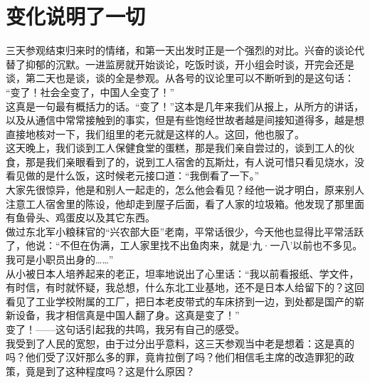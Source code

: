 \fancyhead[RO]{} %
\fancyhead[LE]{} %
\chapter*{变化说明了一切}
\thispagestyle{empty}
三天参观结束归来时的情绪，和第一天出发时正是一个强烈的对比。兴奋的谈论代替了抑郁的沉默。一进监房就开始谈论，吃饭时谈，开小组会时谈，开完会还是谈，第二天也是谈，谈的全是参观。从各号的议论里可以不断听到的是这句话：\\

“变了！社会全变了，中国人全变了！”\\

这真是一句最有概括力的话。“变了！”这本是几年来我们从报上，从所方的讲话，以及从通信中常常接触到的事实，但是有些饱经世故者越是间接知道得多，越是想直接地核对一下，我们组里的老元就是这样的人。这回，他也服了。\\

这天晚上，我们谈到工人保健食堂的蛋糕，那是我们亲自尝过的，谈到工人的伙食，那是我们亲眼看到了的，说到工人宿舍的瓦斯灶，有人说可惜只看见烧水，没看见做的是什么饭，这时候老元接口道：“我倒看了一下。”\\

大家先很惊异，他是和别人一起走的，怎么他会看见？经他一说才明白，原来别人注意工人宿舍里的陈设，他却走到屋子后面，看了人家的垃圾箱。他发现了那里面有鱼骨头、鸡蛋皮以及其它东西。\\

做过东北军小粮秣官的“兴农部大臣”老南，平常话很少，今天他也显得比平常活跃了，他说：“不但在伪满，工人家里找不出鱼肉来，就是‘九·一八’以前也不多见。我可是小职员出身的……”\\

从小被日本人培养起来的老正，坦率地说出了心里话：“我以前看报纸、学文件，有时信，有时就怀疑，我总想，什么东北工业基地，还不是日本人给留下的？这回看见了工业学校附属的工厂，把日本老皮带式的车床挤到一边，到处都是国产的崭新设备，我才相信真是中国人翻了身。这真是变了！”\\

变了！——这句话引起我的共鸣，我另有自己的感受。\\

我受到了人民的宽恕，由于过分出乎意料，这三天参观当中老是想着：这是真的吗？他们受了汉奸那么多的罪，竟肯拉倒了吗？他们相信毛主席的改造罪犯的政策，竟是到了这种程度吗？这是什么原因？\\

